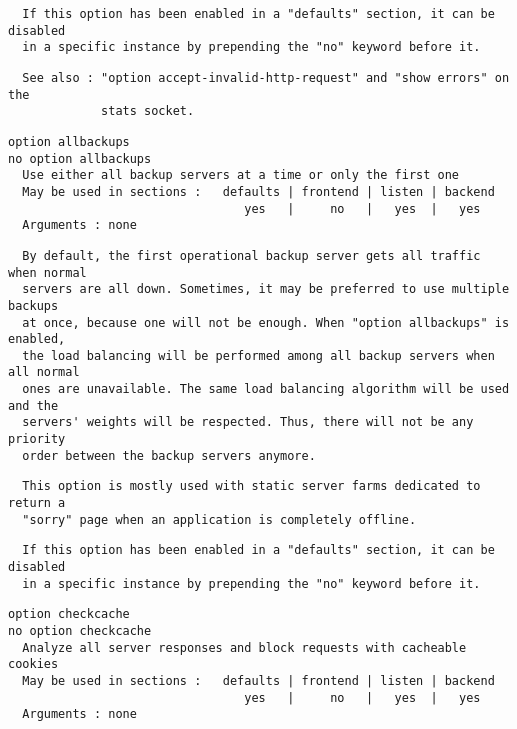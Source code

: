 \begin{verbatim}
  If this option has been enabled in a "defaults" section, it can be disabled
  in a specific instance by prepending the "no" keyword before it.
\end{verbatim}

\begin{verbatim}
  See also : "option accept-invalid-http-request" and "show errors" on the
             stats socket.
\end{verbatim}

\begin{verbatim}
option allbackups
no option allbackups
  Use either all backup servers at a time or only the first one
  May be used in sections :   defaults | frontend | listen | backend
                                 yes   |     no   |   yes  |   yes
  Arguments : none
\end{verbatim}

\begin{verbatim}
  By default, the first operational backup server gets all traffic when normal
  servers are all down. Sometimes, it may be preferred to use multiple backups
  at once, because one will not be enough. When "option allbackups" is enabled,
  the load balancing will be performed among all backup servers when all normal
  ones are unavailable. The same load balancing algorithm will be used and the
  servers' weights will be respected. Thus, there will not be any priority
  order between the backup servers anymore.
\end{verbatim}

\begin{verbatim}
  This option is mostly used with static server farms dedicated to return a
  "sorry" page when an application is completely offline.
\end{verbatim}

\begin{verbatim}
  If this option has been enabled in a "defaults" section, it can be disabled
  in a specific instance by prepending the "no" keyword before it.
\end{verbatim}

\begin{verbatim}
option checkcache
no option checkcache
  Analyze all server responses and block requests with cacheable cookies
  May be used in sections :   defaults | frontend | listen | backend
                                 yes   |     no   |   yes  |   yes
  Arguments : none
\end{verbatim}

